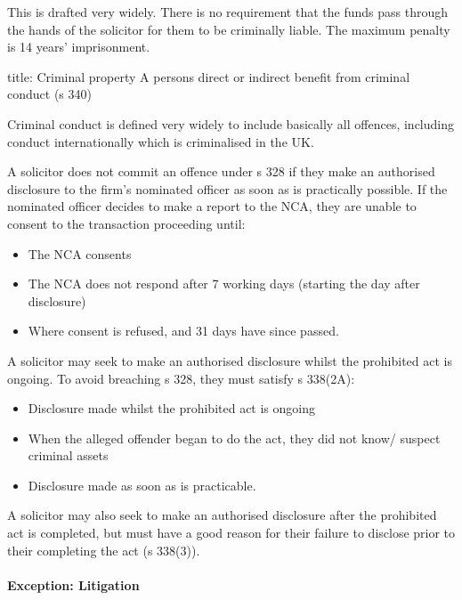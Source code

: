 \documentclass[
]{article}
\newenvironment{Shaded}{}{}
\newcommand{\NormalTok}[1]{#1}
\providecommand{\tightlist}{%
  \setlength{\itemsep}{0pt}\setlength{\parskip}{0pt}}
\begin{document}
This is drafted very widely. There is no requirement that the funds pass
through the hands of the solicitor for them to be criminally liable. The
maximum penalty is 14 years' imprisonment.

\begin{Shaded}
\begin{Highlighting}[]
\NormalTok{title: Criminal property}
\NormalTok{A person\textquotesingle{}s direct or indirect benefit from criminal conduct (s 340)}
\end{Highlighting}
\end{Shaded}

Criminal conduct is defined very widely to include basically all
offences, including conduct internationally which is criminalised in the
UK.

A solicitor does not commit an offence under s 328 if they make an
authorised disclosure to the firm's nominated officer as soon as is
practically possible. If the nominated officer decides to make a report
to the NCA, they are unable to consent to the transaction proceeding
until:

\begin{itemize}
\tightlist
\item
  The NCA consents
\item
  The NCA does not respond after 7 working days (starting the day after
  disclosure)
\item
  Where consent is refused, and 31 days have since passed.
\end{itemize}

A solicitor may seek to make an authorised disclosure whilst the
prohibited act is ongoing. To avoid breaching s 328, they must satisfy s
338(2A):

\begin{itemize}
\tightlist
\item
  Disclosure made whilst the prohibited act is ongoing
\item
  When the alleged offender began to do the act, they did not know/
  suspect criminal assets
\item
  Disclosure made as soon as is practicable.
\end{itemize}

A solicitor may also seek to make an authorised disclosure after the
prohibited act is completed, but must have a good reason for their
failure to disclose prior to their completing the act (s 338(3)).

\hypertarget{exception-litigation}{%
\paragraph{Exception: Litigation}\label{exception-litigation}}
\end{document}
